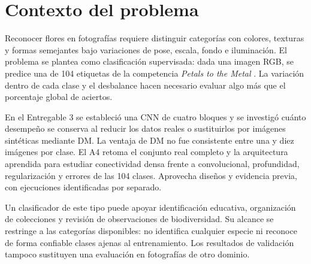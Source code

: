\section{Contexto del problema}
Reconocer flores en fotografías requiere distinguir categorías con colores,
texturas y formas semejantes bajo variaciones de pose, escala, fondo e iluminación.
El problema se plantea como clasificación supervisada: dada una imagen RGB,
se predice una de 104 etiquetas de la competencia \textit{Petals to the Metal}
\citep{kagglePetalsMetal}. La variación dentro de cada clase y el desbalance
hacen necesario evaluar algo más que el porcentaje global de aciertos.

En el Entregable 3 se estableció una CNN de cuatro bloques y se investigó cuánto
desempeño se conserva al reducir los datos reales o sustituirlos por imágenes
sintéticas mediante DM. La ventaja de DM no fue consistente entre una y diez
imágenes por clase. El A4 retoma el conjunto real completo y la arquitectura
aprendida para estudiar conectividad densa frente a convolucional, profundidad,
regularización y errores de las 104 clases. Aprovecha diseños y evidencia previa,
con ejecuciones identificadas por separado.

Un clasificador de este tipo puede apoyar identificación educativa, organización
de colecciones y revisión de observaciones de biodiversidad. Su alcance se
restringe a las categorías disponibles: no identifica cualquier especie ni
reconoce de forma confiable clases ajenas al entrenamiento. Los resultados de
validación tampoco sustituyen una evaluación en fotografías de otro dominio.
